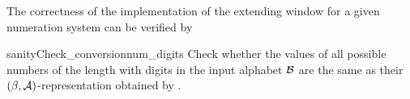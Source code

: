 

The correctness of the implementation of the extending window for a given numeration system can be verified by
 
\begin{method}{sanityCheck\_conversion}{num\_digits}
Check whether the values of all possible numbers of the length  with digits in the input alphabet $\mathcal{B}$ are the same as their $(\beta, \mathcal{A})$-representation obtained by .   
\end{method}

